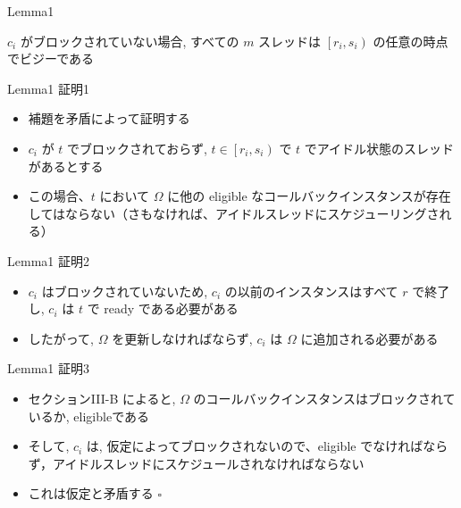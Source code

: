 \begin{frame}{Lemma1}
    \begin{lemma}[]
        $c_{i}$ がブロックされていない場合, すべての $m$ スレッドは $\left[r_{i}, s_{i}\right)$ の任意の時点でビジーである
    \end{lemma}
\end{frame}





\begin{frame}{Lemma1 証明1}
    \begin{itemize}
        \item 補題を矛盾によって証明する
        \item $c_{i}$ が $t$ でブロックされておらず, $t \in\left[r_{i}, s_{i}\right)$ で $t$ でアイドル状態のスレッドがあるとする
        \item この場合、$t$ において $\Omega$ に他の eligible なコールバックインスタンスが存在してはならない（さもなければ、アイドルスレッドにスケジューリングされる）
    \end{itemize}

\end{frame}

\begin{frame}{Lemma1 証明2}
    \begin{itemize}
        \item $c_{i}$ はブロックされていないため, $c_{i}$ の以前のインスタンスはすべて $r$ で終了し, $c_{i}$ は $t$ で ready である必要がある
        \item したがって, $\Omega$ を更新しなければならず, $c_{i}$ は $\Omega$ に追加される必要がある

    \end{itemize}
\end{frame}

\begin{frame}{Lemma1 証明3}
    \begin{itemize}
        \item セクションIII-B によると, $\Omega$ のコールバックインスタンスはブロックされているか, eligibleである
        \item そして, $c_{i}$ は, 仮定によってブロックされないので、eligible でなければならず，アイドルスレッドにスケジュールされなければならない
        \item これは仮定と矛盾する $\square$
    \end{itemize}
\end{frame}

